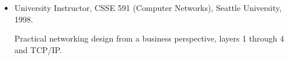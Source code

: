 \begin{itemize}
	\item University Instructor, CSSE 591 (Computer Networks), Seattle University, 1998.
        \vspace{-2mm}
        \begin{myquote}
            Practical networking design from a business perspective, layers
            1 through 4 and TCP/IP.
        \end{myquote}
\end{itemize}

